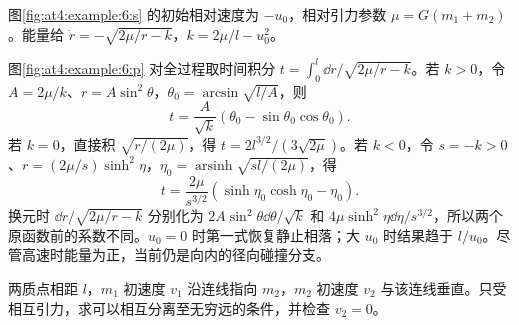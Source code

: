 \begin{solution}
图\ref{fig:at4:example:6:s} 的初始相对速度为 $-u_0$，相对引力参数 $\mu=G(m_1+m_2)$。能量给 $\dot r=-\sqrt{2\mu/r-k}$，$k=2\mu/l-u_0^2$。

图\ref{fig:at4:example:6:p} 对全过程取时间积分 $t=\int_0^l\dd r/\sqrt{2\mu/r-k}$。若 $k>0$，令 $A=2\mu/k$、$r=A\sin^2\theta$，$\theta_0=\arcsin\sqrt{l/A}$，则
\[t=\frac{A}{\sqrt k}(\theta_0-\sin\theta_0\cos\theta_0).
\]
若 $k=0$，直接积 $\sqrt{r/(2\mu)}$，得 $t=2l^{3/2}/(3\sqrt{2\mu})$。若 $k<0$，令 $s=-k>0$、$r=(2\mu/s)\sinh^2\eta$，$\eta_0=\operatorname{arsinh}\sqrt{sl/(2\mu)}$，得
\[t=\frac{2\mu}{s^{3/2}}(\sinh\eta_0\cosh\eta_0-\eta_0).
\]
换元时 $\dd r/\sqrt{2\mu/r-k}$ 分别化为 $2A\sin^2\theta\dd\theta/\sqrt k$ 和 $4\mu\sinh^2\eta\dd\eta/s^{3/2}$，所以两个原函数前的系数不同。$u_0=0$ 时第一式恢复静止相落；大 $u_0$ 时结果趋于 $l/u_0$。尽管高速时能量为正，当前仍是向内的径向碰撞分支。\end{solution}
\begin{question}\begin{example}[垂直初速度下的相互逃逸]\label{at4:example:7}
两质点相距 $l$，$m_1$ 初速度 $v_1$ 沿连线指向 $m_2$，$m_2$ 初速度 $v_2$ 与该连线垂直。只受相互引力，求可以相互分离至无穷远的条件，并检查 $v_2=0$。
\end{example}
\end{question}

